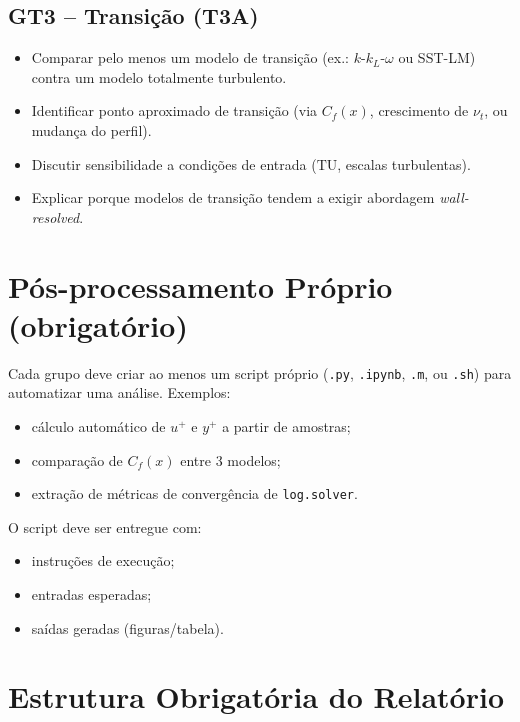 \documentclass[12pt,a4paper]{article}
\begin{document}
\subsection{GT3 -- Transição (T3A)}

\begin{itemize}
  \item Comparar pelo menos um modelo de transição (ex.: $k$-$k_L$-$\omega$ ou SST-LM) contra um modelo totalmente turbulento.
  \item Identificar ponto aproximado de transição (via $C_f(x)$, crescimento de $\nu_t$, ou mudança do perfil).
  \item Discutir sensibilidade a condições de entrada ($\mathrm{TU}$, escalas turbulentas).
  \item Explicar porque modelos de transição tendem a exigir abordagem \textit{wall-resolved}.
\end{itemize}

\section{Pós-processamento Próprio (obrigatório)}

Cada grupo deve criar ao menos um script próprio (\texttt{.py}, \texttt{.ipynb}, \texttt{.m}, ou \texttt{.sh}) para automatizar uma análise. Exemplos:
\begin{itemize}
  \item cálculo automático de $u^+$ e $y^+$ a partir de amostras;
  \item comparação de $C_f(x)$ entre 3 modelos;
  \item extração de métricas de convergência de \texttt{log.solver}.
\end{itemize}

O script deve ser entregue com:
\begin{itemize}
  \item instruções de execução;
  \item entradas esperadas;
  \item saídas geradas (figuras/tabela).
\end{itemize}

\section{Estrutura Obrigatória do Relatório}
\end{document}
